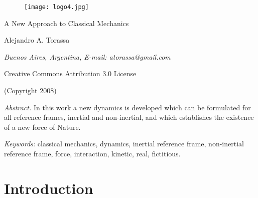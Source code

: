 \documentclass[12pt]{article}
\begin{document}
\begin{figure}
\texttt{[image: logo4.jpg]}
\end{figure}

\begin{center}

{\Large A New Approach to Classical Mechanics}

\bigskip \bigskip

\small

Alejandro A. Torassa

\footnotesize

\medskip

{\em Buenos Aires, Argentina, E-mail: atorassa@gmail.com}

\medskip

Creative Commons Attribution 3.0 License

\medskip

(Copyright 2008)

\end{center}

\bigskip

\footnotesize

{\em Abstract.\/} In this work a new dynamics is developed which can be formulated for all reference frames, inertial and non-inertial, and which establishes the existence of a new force of Nature.

\bigskip

{\em Keywords:\/} classical mechanics, dynamics, inertial reference frame, non-inertial reference frame, force, interaction, kinetic, real, fictitious.

\normalsize

{\centering\section*{Introduction}}
\end{document}
